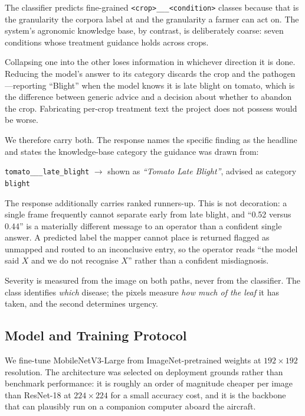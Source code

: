 \documentclass[conference]{IEEEtran}
\begin{document}
The classifier predicts fine-grained \texttt{<crop>\_\_\_<condition>} classes
because that is the granularity the corpora label at and the granularity a
farmer can act on. The system's agronomic knowledge base, by contrast, is
deliberately coarse: seven conditions whose treatment guidance holds across
crops.

Collapsing one into the other loses information in whichever direction it is
done. Reducing the model's answer to its category discards the crop and the
pathogen---reporting ``Blight'' when the model knows it is late blight on
tomato, which is the difference between generic advice and a decision about
whether to abandon the crop. Fabricating per-crop treatment text the project
does not possess would be worse.

We therefore carry both. The response names the specific finding as the
headline and states the knowledge-base category the guidance was drawn from:

\begin{center}\footnotesize
\texttt{tomato\_\_\_late\_blight} $\rightarrow$
shown as \emph{``Tomato Late Blight''},
advised as category \texttt{blight}
\end{center}

The response additionally carries ranked runners-up. This is not decoration: a
single frame frequently cannot separate early from late blight, and
``0.52 versus 0.44'' is a materially different message to an operator than a
confident single answer. A predicted label the mapper cannot place is returned
flagged as unmapped and routed to an inconclusive entry, so the operator reads
``the model said $X$ and we do not recognise $X$'' rather than a confident
misdiagnosis.

Severity is measured from the image on both paths, never from the classifier.
The class identifies \emph{which} disease; the pixels measure \emph{how much of
the leaf} it has taken, and the second determines urgency.

\subsection{Model and Training Protocol}

We fine-tune MobileNetV3-Large \cite{howard2019} from ImageNet-pretrained
weights at $192\times192$ resolution. The architecture was selected on
deployment grounds rather than benchmark performance: it is roughly an order of
magnitude cheaper per image than ResNet-18 at $224\times224$ for a small
accuracy cost, and it is the backbone that can plausibly run on a companion
computer aboard the aircraft.
\end{document}
